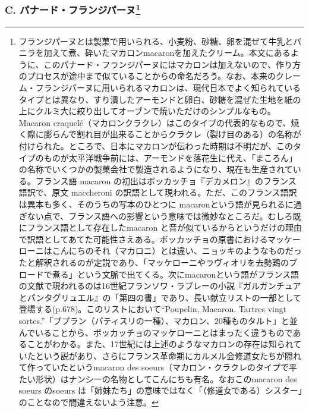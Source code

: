 \begin{recette}
{\subsubsection[C. パナード・フランジパーヌ]{\texorpdfstring{C.
パナード・フランジパーヌ\footnote{フランジパーヌとは製菓で用いられる、小麦粉、砂糖、卵を混ぜて牛乳とバニラを加えて煮、砕いたマカロンmacaronを加えたクリーム。本文にあるように、このパナード・フランジパーヌにはマカロンは加えないので、作り方のプロセスが途中まで似ていることからの命名だろう。なお、本来のクレーム・フランジパーヌに用いられるマカロンは、現代日本でよく知られているタイプとは異なり、すり潰したアーモンドと卵白、砂糖を混ぜた生地を紙の上にクルミ大に絞り出してオーブンで焼いただけのシンプルなもの。Macaron
  craquelé（マカロンクラクレ）はこのタイプの代表的なもので、焼く際に膨らんで割れ目が出来ることからクラクレ（裂け目のある）の名称が付けられた。ところで、日本にマカロンが伝わった時期は不明だが、このタイプのものが太平洋戦争前には、アーモンドを落花生に代え、「まころん」の名称でいくつかの製菓会社で製造されるようになり、現在も生産されている。フランス語
  macaron の初出はボッカッチョ『デカメロン』のフランス語訳で、原文
  maccheroni
  の訳語として現われる。ただ、このフランス語訳は異本も多く、そのうちの写本のひとつに
  macaronという語が見られるに過ぎない点で、フランス語への影響という意味では微妙なところだ。むしろ既にフランス語として存在したmacaron
  と音が似ているからというだけの理由で訳語としてあてた可能性さえある。ボッカッチョの原書におけるマッケーローニはこんにちのそれ（マカロニ）とは違い、ニョッキのようなものだったと解釈されるのが定説であり、「マッケローニやラヴィオリを去勢鶏のブロードで煮る」という文脈で出てくる。次にmacaronという語がフランス語の文献で現われるのは16世紀フランソワ・ラブレーの小説『ガルガンチュアとパンタグリュエル』の「第四の書」であり、長い献立リストの一部として登場する(p.678)。このリストにおいて``Poupelin,
  Macaron. Tartres vingt
  sortes.''「ププラン（パティスリの一種）、マカロン、20種ものタルト」と並んでいることから、ボッカッチョのマッケローニとはまったく違うものであることがわかる。また、17世紀には上述のようなマカロンの存在は知られていたという説があり、さらにフランス革命期にカルメル会修道女たちが隠れて作っていたというmacaron
  des
  soeurs（マカロン・クラクレのタイプで平たい形状）はナンシーの名物としてこんにちも有名。なおこのmacaron
  des soeurs のsoeurs
  は「姉妹たち」の意味ではなく「（修道女である）シスター」のことなので間違えないよう注意。}}{C. パナード・フランジパーヌ}}\label{panade-c}}




\end{recette}

